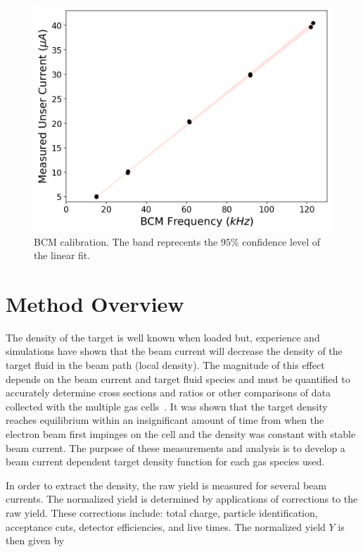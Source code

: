 \documentclass[final,5p,times,twocolumn]{elsarticle}
\begin{document}
\begin{figure}[!h]
      \centering
    \includegraphics[width=\linewidth]{dnew_calibration.pdf}
    \caption{BCM calibration. The band reprecents the $95\%$ confidence level of the linear fit.}
    \label{fig:dnew_cal}
\end{figure}


\section{Method Overview}

The density of the target is well known when loaded but, experience and simulations have shown that the beam current will 
decrease the density of the target fluid in the beam path (local density). The magnitude of this effect depends on the 
beam current and target fluid species and must be quantified to accurately determine cross sections and ratios or 
other comparisons of data collected with the multiple gas cells~\cite{celldes}. 
It was shown that the target density reaches equilibrium within an insignificant amount of time from when the 
electron beam first impinges on the cell and the density was constant with stable beam current. The purpose of 
these measurements and analysis is to develop a beam current dependent target density function for each gas species used.  

In order to extract the density, the raw yield is measured for several beam currents. The normalized yield is 
determined by applications of corrections  to the raw yield. These corrections include: total charge, 
particle identification, acceptance cuts, detector efficiencies, and live times. The normalized yield $Y$ is then given by
\end{document}
